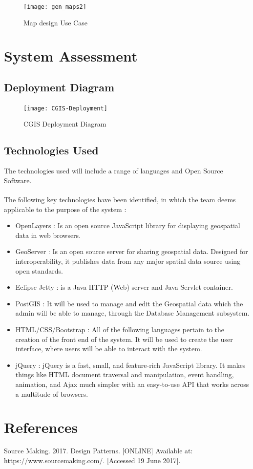 \documentclass{article}
\begin{document}
 \newpage   
            \begin{figure}[h!]
	\centering
	\texttt{[image: gen\_maps2]}
	\caption{Map design Use Case}
\end{figure}
            
  \newpage          
    \section{System Assessment}
    	\subsection{Deployment Diagram}
        
        \begin{figure}[h!]
        \texttt{[image: CGIS-Deployment]}
            \caption{CGIS Deployment Diagram}
        \end{figure}
        
        \subsection{Technologies Used}
        {The technologies used will include a range of languages and Open Source Software.\\\\
        The following key technologies have been identified, in which the team deems applicable to the purpose of the system :
        \begin{itemize}
        \item OpenLayers : Is an open source JavaScript library for displaying geospatial data in web browsers.
        \item GeoServer :  Is an open source server for sharing geospatial data. Designed for interoperability, it publishes data from any major spatial data source using open standards.
        \item Eclipse Jetty : is a Java HTTP (Web) server and Java Servlet container.
        \item PostGIS : It will be used to manage and edit the Geospatial data which the admin will be able to manage, through the Database Management subsystem.
        \item HTML/CSS/Bootstrap : All of the following languages pertain to the creation of the front end of the system. It will be used to create the user interface, where users will be able to interact with the system.
        \item jQuery : jQuery is a fast, small, and feature-rich JavaScript library. It makes things like HTML document traversal and manipulation, event handling, animation, and Ajax much simpler with an easy-to-use API that works across a multitude of browsers.
        
        \end{itemize}}

\newpage
\section{References}
{Source Making. 2017. Design Patterns. [ONLINE] Available at: https://www.sourcemaking.com/. [Accessed 19 June 2017].}
         
\end{document}
